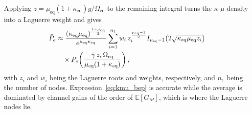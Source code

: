 \documentclass[12pt, draftclsnofoot, onecolumn]{IEEEtran}
\newcommand{\rev}[1]{#1}
\begin{document}
\rev{Applying $z=\mu_{\text{eq}}(1+\kappa_{\text{eq}})g/\Omega_{\text{eq}}$ to the remaining integral
turns the $\kappa$-$\mu$ density into a Laguerre weight and gives
\begin{align}
\bar P_e &\approx
\frac{(\kappa_{\text{eq}}\mu_{\text{eq}})^{\frac{1-\mu_{\text{eq}}}{2}}}{e^{\mu_{\text{eq}}\kappa_{\text{eq}}}}
\sum_{i=1}^{n_1} w_i\,
z_i^{\frac{\mu_{\text{eq}}-1}{2}}
I_{\mu_{\text{eq}}-1}\!\left(2\sqrt{\kappa_{\text{eq}}\mu_{\text{eq}}z_i}\right)
\notag\\
&\quad\times
P_e\!\left(\frac{\bar\gamma\,z_i\,\Omega_{\text{eq}}}{\mu_{\text{eq}}(1+\kappa_{\text{eq}})}\right),
\label{eq:kmu_bep}
\end{align}
with $z_i$ and $w_i$ being the Laguerre roots and weights, respectively, and
$n_1$ being the number of nodes.
Expression~\eqref{eq:kmu_bep} is accurate while the average is
dominated by channel gains of the order of $\mathbb{E}[G_M]$, which is where the
Laguerre nodes lie.
}
\end{document}
